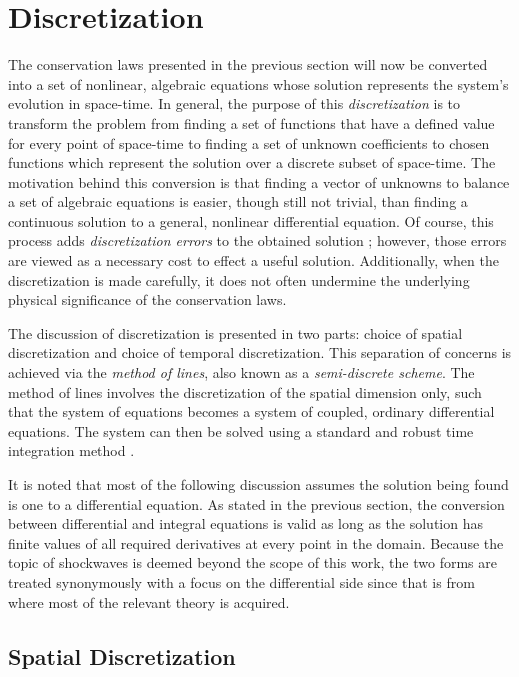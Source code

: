 \section{Discretization}

The conservation laws presented in the previous section will now be converted into a set of nonlinear, algebraic equations whose solution represents the system's evolution in space-time.
In general, the purpose of this \textit{discretization} is to transform the problem from finding a set of functions that have a defined value for every point of space-time to finding a set of unknown coefficients to chosen functions which represent the solution over a discrete subset of space-time.
The motivation behind this conversion is that finding a vector of unknowns to balance a set of algebraic equations is easier, though still not trivial, than finding a continuous solution to a general, nonlinear differential equation.
Of course, this process adds \textit{discretization errors} to the obtained solution \cite{leveque_finite_2007}; however, those errors are viewed as a necessary cost to effect a useful solution.
Additionally, when the discretization is made carefully, it does not often undermine the underlying physical significance of the conservation laws.

The discussion of discretization is presented in two parts: choice of spatial discretization and choice of temporal discretization.
This separation of concerns is achieved via the \textit{method of lines}, also known as a \textit{semi-discrete scheme}.
The method of lines involves the discretization of the spatial dimension only, such that the system of equations becomes a system of coupled, ordinary differential equations.
The system can then be solved using a standard and robust  time integration method \cite{schiesser_numerical_2012}.

It is noted that most of the following discussion assumes the solution being found is one to a differential equation.
As stated in the previous section, the conversion between differential and integral equations is valid as long as the solution has finite values of all required derivatives at every point in the domain.
Because the topic of shockwaves is deemed beyond the scope of this work, the two forms are treated synonymously with a focus on the differential side since that is from where most of the relevant theory is acquired.


\subsection{Spatial Discretization}

